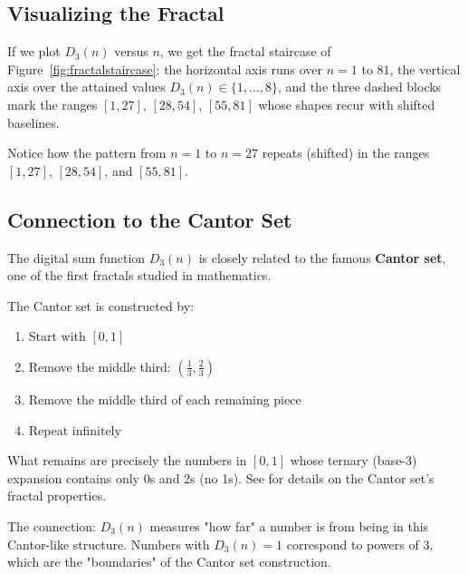 \subsection{Visualizing the Fractal}
\label{subsec:visualizing-fractal}


If we plot $D_3(n)$ versus $n$, we get the fractal staircase of
Figure~\ref{fig:fractalstaircase}: the horizontal axis runs over $n = 1$ to
$81$, the vertical axis over the attained values $D_3(n) \in \{1, \ldots, 8\}$,
and the three dashed blocks mark the ranges $[1,27]$, $[28,54]$, $[55,81]$ whose
shapes recur with shifted baselines.

Notice how the pattern from $n=1$ to $n=27$ repeats (shifted) in the ranges $[1,27]$, $[28,54]$, and $[55,81]$.

\subsection{Connection to the Cantor Set}
\label{subsec:cantor-connection}


The digital sum function $D_3(n)$ is closely related to the famous \textbf{Cantor set}, one of the first fractals studied in mathematics.

The Cantor set \cite{cantor1883} is constructed by:
\begin{enumerate}
\item Start with $[0, 1]$
\item Remove the middle third: $(\frac{1}{3}, \frac{2}{3})$
\item Remove the middle third of each remaining piece
\item Repeat infinitely
\end{enumerate}

What remains are precisely the numbers in $[0,1]$ whose ternary (base-3) expansion contains only 0s and 2s (no 1s). See \cite{falconer2004} for details on the Cantor set's fractal properties.

The connection: $D_3(n)$ measures "how far" a number is from being in this Cantor-like structure. Numbers with $D_3(n) = 1$ correspond to powers of 3, which are the "boundaries" of the Cantor set construction.

